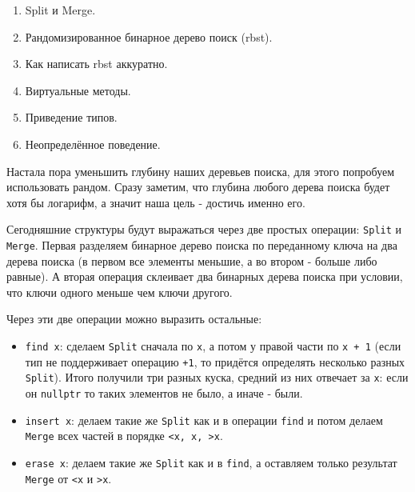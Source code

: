 \label{md2tex8}
\hyperref[md2texREADME]{\color{cyan}{К главному описанию}}


\begin{enumerate}
    \item Split и Merge.
    \item Рандомизированное бинарное дерево поиск (rbst).
    \item Как написать rbst аккуратно.
    \item Виртуальные методы.
    \item Приведение типов.
    \item Неопределённое поведение.
\end{enumerate}


Настала пора уменьшить глубину наших деревьев поиска, для этого попробуем использовать рандом. Сразу заметим, что глубина любого дерева поиска будет хотя бы логарифм, а значит наша цель - достичь именно его.


Сегодняшние структуры будут выражаться через две простых операции: \texttt{Split} и \texttt{Merge}. Первая разделяем бинарное дерево поиска по переданному ключа на два дерева поиска (в первом все элементы меньшие, а во втором - больше либо равные). А вторая операция склеивает два бинарных дерева поиска при условии, что ключи одного меньше чем ключи другого.

Через эти две операции можно выразить остальные:
\begin{itemize}
    \item \texttt{find x}: сделаем \texttt{Split} сначала по \texttt{x}, а потом у правой части по \texttt{x + 1} (если тип не поддерживает операцию \texttt{+1}, то придётся определять несколько разных \texttt{Split}). Итого получили три разных куска, средний из них отвечает за \texttt{x}: если он \texttt{nullptr} то таких элементов не было, а иначе - были.
    \item \texttt{insert x}: делаем такие же \texttt{Split} как и в операции \texttt{find} и потом делаем \texttt{Merge} всех частей в порядке \texttt{<x, x, >x}.
    \item \texttt{erase x}: делаем такие же \texttt{Split} как и в \texttt{find}, а оставляем только результат \texttt{Merge} от \texttt{<x} и \texttt{>x}.
\end{itemize}

